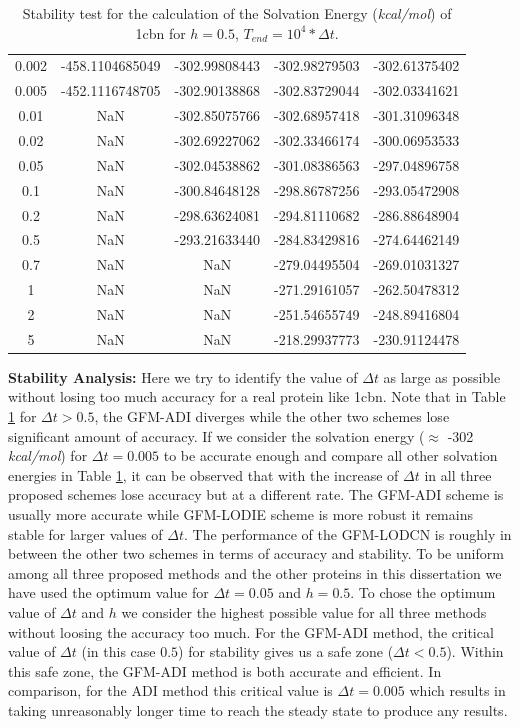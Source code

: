 \begin{table}[!t]
\begin{tabular}{c c c c c }
0.002 & -458.1104685049 & -302.99808443  & -302.98279503   & -302.61375402 \\
0.005 & -452.1116748705 & -302.90138868  & -302.83729044   & -302.03341621   \\
0.01  &    NaN         & -302.85075766   & -302.68957418   & -301.31096348   \\
0.02  &    NaN         & -302.69227062   & -302.33466174   & -300.06953533   \\
0.05  &    NaN          & -302.04538862   & -301.08386563   & -297.04896758   \\
0.1   &    NaN          & -300.84648128   & -298.86787256   & -293.05472908   \\
0.2   &    NaN           & -298.63624081   & -294.81110682   & -286.88648904   \\
0.5   &    NaN          & -293.21633440   & -284.83429816   & -274.64462149   \\
0.7   &   NaN           & NaN             & -279.04495504   & -269.01031327   \\
1     &     NaN         & NaN             & -271.29161057   & -262.50478312   \\
2     &    NaN          & NaN             & -251.54655749   & -248.89416804   \\
5     &    NaN           & NaN             & -218.29937773   & -230.91124478 \\ \hline
\end{tabular}
\caption{Stability test for the calculation of the Solvation Energy ({\it kcal/mol}) of 1cbn for $h=0.5$, $T_{end} = 10^4*\Delta t$.}
\label{tab-1cbn}
\end{table}

{\bf Stability Analysis:} Here we try to identify the value of $\Delta t$ as large as possible without losing too much accuracy for a real protein like 1cbn. Note that in Table \ref{tab-1cbn} for $\Delta t > 0.5$, the GFM-ADI diverges while the other two schemes lose significant amount of accuracy. If we consider the solvation energy ($\approx $ -302 {\it kcal/mol}) for $\Delta t =0.005$ to be accurate enough and compare all other solvation energies in Table \ref{tab-1cbn}, it can be observed that with the increase of $\Delta t$ in all three proposed schemes lose accuracy but at a different rate. The GFM-ADI scheme is usually more accurate while GFM-LODIE scheme is more robust it remains stable for larger values of $\Delta t$. The performance of the GFM-LODCN is roughly in between the other two schemes in terms of accuracy and stability. To be uniform  among all three proposed methods and the other proteins in this dissertation we have used the optimum value for $\Delta t =0.05$ and $h=0.5$. To chose the optimum value of $\Delta t$ and $h$ we consider the highest possible value for all three methods without loosing the accuracy too much. For the GFM-ADI method, the critical value of $\Delta t$ (in this case $0.5$) for stability gives us a safe zone ($\Delta t < 0.5$). Within this safe zone, the GFM-ADI method is both accurate and efficient. In comparison, for the ADI method this critical value is $\Delta t = 0.005$ which results in taking unreasonably longer time to reach the steady state to produce any results. 


